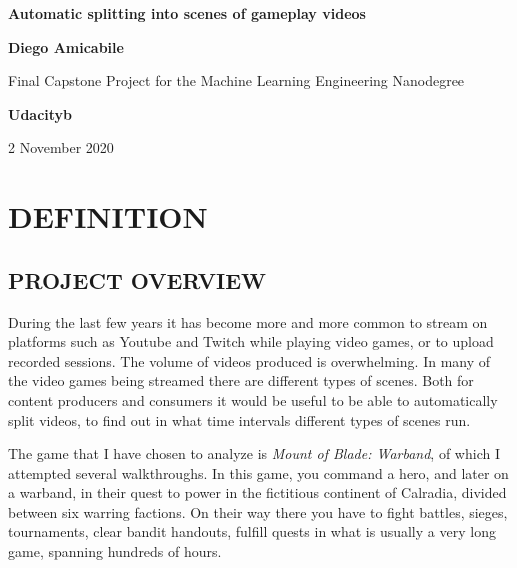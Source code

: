 \documentclass[
]{article}
\author{}
\date{}
\newcommand{\hhref}[3][blue]{\href{#2}{\color{#1}{#3}}}%
\begin{document}
\begin{titlepage}
	\begin{center}
		\vspace*{1cm}
		
		\textbf{Automatic splitting into scenes of gameplay videos}
		
		\vspace{0.5cm}
		\hhref{https://github.com/diegoami/DA_ML_Capstone}{https://github.com/diegoami/DA\_ML\_Capstone}
		
		\vspace{1.5cm}
		
		\textbf{Diego Amicabile}
		
		\vfill
		
		Final Capstone Project for the Machine Learning Engineering Nanodegree
		\vspace{0.8cm}
	
		\textbf{Udacityb}
		
		\vspace{0.8cm}
		

		2 November 2020
		
	\end{center}
\end{titlepage}

\hypertarget{definition}{%
\section{DEFINITION}\label{definition}}

\hypertarget{project-overview}{%
\subsection{PROJECT OVERVIEW}\label{project-overview}}

During the last few years it has become more and more common to stream
on platforms such as Youtube and Twitch while playing video games, or to
upload recorded sessions. The volume of videos produced is overwhelming.
In many of the video games being streamed there are different types of
scenes. Both for content producers and consumers it would be useful to
be able to automatically split videos, to find out in what time
intervals different types of scenes run. 

The game that I have chosen to analyze is \emph{Mount of Blade:
Warband}, of which I attempted several walkthroughs. In this game, you command a hero, and later on a warband,  in their quest to power in the fictitious continent of Calradia, divided between six warring factions. On their way there you have to fight battles, sieges, tournaments, clear bandit handouts, fulfill quests in what is usually a very long game, spanning hundreds of hours.
\end{document}
